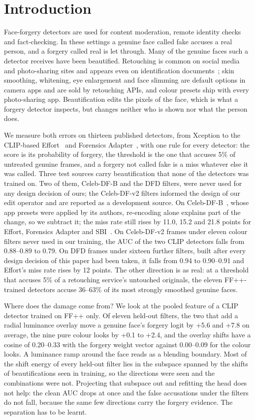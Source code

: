 \section{Introduction}
Face-forgery detectors are used for content moderation, remote identity checks and fact-checking. In these settings a
genuine face called fake accuses a real person, and a forgery called real is let through. Many of the genuine faces such a
detector receives have been beautified. Retouching is common on social media and photo-sharing sites and appears even on
identification documents~\cite{bharati2016}; skin smoothing, whitening, eye enlargement and face slimming are default
options in camera apps and are sold by retouching APIs, and colour presets ship with every photo-sharing app.
Beautification edits the pixels of the face, which is what a forgery detector inspects, but changes neither who is shown
nor what the person does.

We measure both errors on thirteen published detectors, from Xception to the CLIP-based Effort~\cite{effort} and Forensics
Adapter~\cite{forensicsadapter}, with one rule for every detector: the score is its probability of forgery, the threshold is
the one that accuses 5\% of untreated genuine frames, and a forgery not called fake is a miss whatever else it was called.
Three test sources carry beautification that none of the detectors was trained on. Two of them, Celeb-DF-B and the DFD
filters, were never used for any design decision of ours; the Celeb-DF-v2 filters informed the design of our edit operator
and are reported as a development source. On Celeb-DF-B~\cite{libourel2024},
whose app presets were applied by its authors, re-encoding alone explains part of the change, so we subtract it; the miss
rate still rises by 11.0, 15.2 and 21.8 points for Effort, Forensics Adapter and SBI~\cite{sbi}. On Celeb-DF-v2 frames under
eleven colour filters never used in our training, the AUC of the two CLIP detectors falls from 0.88--0.89 to 0.79. On DFD
frames under sixteen further filters, built after every design decision of this paper had been taken, it falls from 0.94 to
0.90--0.91 and Effort's miss rate rises by 12 points. The other direction is as real: at a threshold that accuses 5\% of a
retouching service's untouched originals, the eleven FF++-trained detectors accuse 36--63\% of its most strongly smoothed
genuine faces.

Where does the damage come from? We look at the pooled feature of a CLIP detector trained on FF++ only. Of eleven held-out
filters, the two that add a radial luminance overlay move a genuine face's forgery logit by +5.6 and +7.8 on average, the
nine pure colour looks by +0.1 to +2.4, and the overlay shifts have a cosine of 0.20--0.33 with the forgery weight vector
against 0.00--0.09 for the colour looks. A luminance ramp around the face reads as a blending boundary. Most of the shift
energy of every held-out filter lies in the subspace spanned by the shifts of beautifications seen in training, so the
directions were seen and the combinations were not. Projecting that subspace out and refitting the head does not help:
the clean AUC drops at once and the false accusations under the filters do not fall, because the same few directions
carry the forgery evidence. The separation has to be learnt.

